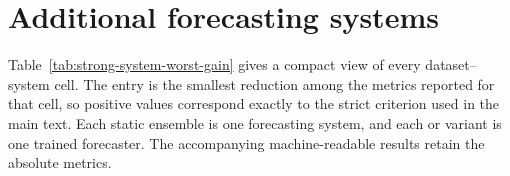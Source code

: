 \section{Additional forecasting systems}
\label{app:strong-systems}

Table~\ref{tab:strong-system-worst-gain} gives a compact view of every
dataset--system cell. The entry is the smallest reduction among the metrics
reported for that cell, so positive values correspond exactly to the strict
criterion used in the main text. Each static ensemble is one forecasting
system, and each \autogluon{} or \chronosbolt{} variant is one trained forecaster.
The accompanying machine-readable results retain the absolute metrics.




